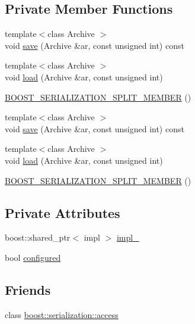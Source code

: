 \subsection*{Private Member Functions}
\begin{DoxyCompactItemize}
\item 
{\footnotesize template$<$class Archive $>$ }\\void \hyperlink{structecto_1_1plasm_a420eb464746042e8247a69828e6782af}{save} (Archive \&ar, const unsigned int) const 
\item 
{\footnotesize template$<$class Archive $>$ }\\void \hyperlink{structecto_1_1plasm_ae6540bca37d0980ec24b0b75061e124e}{load} (Archive \&ar, const unsigned int)
\item 
\hyperlink{structecto_1_1plasm_ac443cf0a58324a8003e1c9fd3b49b428}{B\-O\-O\-S\-T\-\_\-\-S\-E\-R\-I\-A\-L\-I\-Z\-A\-T\-I\-O\-N\-\_\-\-S\-P\-L\-I\-T\-\_\-\-M\-E\-M\-B\-E\-R} ()
\item 
{\footnotesize template$<$class Archive $>$ }\\void \hyperlink{structecto_1_1plasm_a420eb464746042e8247a69828e6782af}{save} (Archive \&ar, const unsigned int) const 
\item 
{\footnotesize template$<$class Archive $>$ }\\void \hyperlink{structecto_1_1plasm_ae6540bca37d0980ec24b0b75061e124e}{load} (Archive \&ar, const unsigned int)
\item 
\hyperlink{structecto_1_1plasm_ac443cf0a58324a8003e1c9fd3b49b428}{B\-O\-O\-S\-T\-\_\-\-S\-E\-R\-I\-A\-L\-I\-Z\-A\-T\-I\-O\-N\-\_\-\-S\-P\-L\-I\-T\-\_\-\-M\-E\-M\-B\-E\-R} ()
\end{DoxyCompactItemize}
\subsection*{Private Attributes}
\begin{DoxyCompactItemize}
\item 
boost\-::shared\-\_\-ptr$<$ impl $>$ \hyperlink{structecto_1_1plasm_a3fa8095e74d8f7b36a5fce7ebcd3e79c}{impl\-\_\-}
\item 
bool \hyperlink{structecto_1_1plasm_a8d074da8290587fab0ed04d5cfe3f6b1}{configured}
\end{DoxyCompactItemize}
\subsection*{Friends}
\begin{DoxyCompactItemize}
\item 
class \hyperlink{structecto_1_1plasm_a4305f269960e8ccc92b19b2f0480b16d}{boost\-::serialization\-::access}
\end{DoxyCompactItemize}


